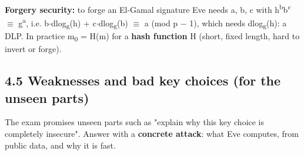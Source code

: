\documentclass[11pt,a4paper]{article}
\begin{document}
\textbf{Forgery security:} to forge an El-Gamal signature Eve needs a, b, c with h\textsuperscript{b}b\textsuperscript{c} \ensuremath{\equiv} g\textsuperscript{a}, i.e. b\ensuremath{\cdot}dlog\textsubscript{g}(h) + c\ensuremath{\cdot}dlog\textsubscript{g}(b) \ensuremath{\equiv} a (mod p \ensuremath{-} 1), which needs dlog\textsubscript{g}(h): a DLP. In practice m\textsubscript{0} = H(m) for a \textbf{hash function} H (short, fixed length, hard to invert or forge).\par
\subsection*{4.5 Weaknesses and bad key choices (for the unseen parts)}\label{ch4-weak}
The exam promises unseen parts such as "explain why this key choice is completely insecure". Answer with a \textbf{concrete attack}: what Eve computes, from public data, and why it is fast.\par
\end{document}
